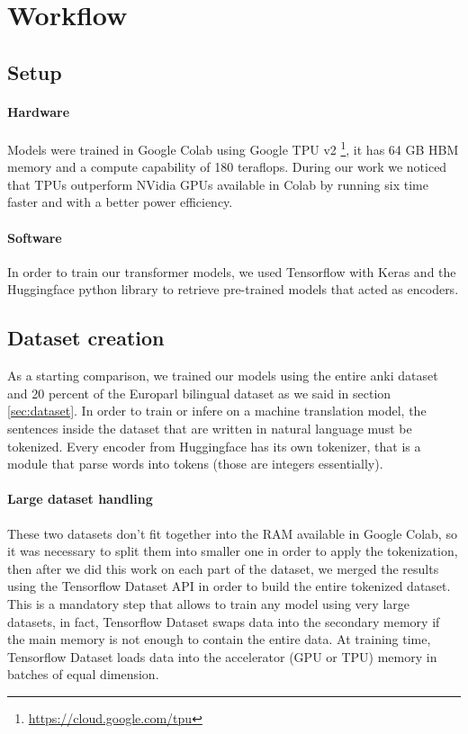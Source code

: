 \section{Workflow}
\subsection{Setup}
\paragraph{Hardware}
Models were trained in Google Colab using Google TPU v2 \footnote{\url{https://cloud.google.com/tpu}},  it has 64 GB HBM memory and a compute capability of 180 teraflops. During our work we noticed that TPUs outperform NVidia GPUs available in Colab by running six time faster and with a better power efficiency.
\paragraph{Software}
In order to train our transformer models, we used Tensorflow with Keras \cite{keras_io} and the Huggingface \cite{huggingface_co} python library to retrieve pre-trained models that acted as encoders.

\subsection{Dataset creation}
As a starting comparison, we trained our models using the entire anki dataset and 20 percent of the Europarl bilingual dataset as we said in section \ref{sec:dataset}. In order to train or infere on a machine translation model, the sentences inside the dataset that are written in natural language must be tokenized. Every encoder from Huggingface has its own tokenizer, that is a module that parse words into tokens (those are integers essentially).

\paragraph{Large dataset handling} These two datasets don't fit together into the RAM available in Google Colab, so it was necessary to split them into smaller one in order to apply the tokenization, then after we did this work on each part of the dataset, we merged the results using the Tensorflow Dataset API in order to build the entire tokenized dataset. This is a mandatory step that allows to train any model using very large datasets, in fact, Tensorflow Dataset swaps data into the secondary memory if the main memory is not enough to contain the entire data. At training time, Tensorflow Dataset loads data into the accelerator (GPU or TPU) memory in batches of equal dimension. 

